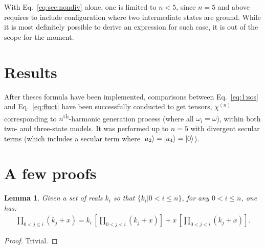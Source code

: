 \documentclass[12pt,a4paper]{article}
\begin{document}
With Eq.~\eqref{eq:sec:nondiv}  alone, one is limited to $n<5$, since $n=5$ and above requires to include configuration where two intermediate states are ground. While it is most definitely possible to derive an expression for such case, it is out of the scope for the moment.

\section{Results}

After theses formula have been implemented, comparisons between Eq.~\eqref{eq:1:sos} and Eq.~\eqref{eq:fluct} have been successfully conducted to get tensors, $\chi^{(n)}$ corresponding to $n$\textsuperscript{th}-harmonic generation process (where all $\omega_i = \omega$), within both two- and three-state models.
It was performed up to  $n = 5$ with divergent secular terms (which includes a secular term where $\ket{a_2} = \ket{a_4} = \ket{0}$).


\clearpage
\appendix
\section{A few proofs}
\setcounter{equation}{0} 
\renewcommand{\theequation}{A\arabic{equation}}

\newtheorem{theorem}{Theorem}[section]
\newtheorem{lemma}[theorem]{Lemma}

\begin{lemma}\label{lem:1}
	Given a set of reals $k_i$ so that $\{k_i|0<i\leq n\}$,  for any $0<i\leq n$, one has:\begin{align}
		\prod_{0<j\leq i} (k_j+x)= k_{i}\,\left[\prod_{0<j<i} (k_j+x) \right] + x\,\left[\prod_{0<j<i} (k_j+x) \right].\label{eq:p1:ind}
	\end{align}
\end{lemma}
\begin{proof}
	Trivial.
\end{proof}
\end{document}
